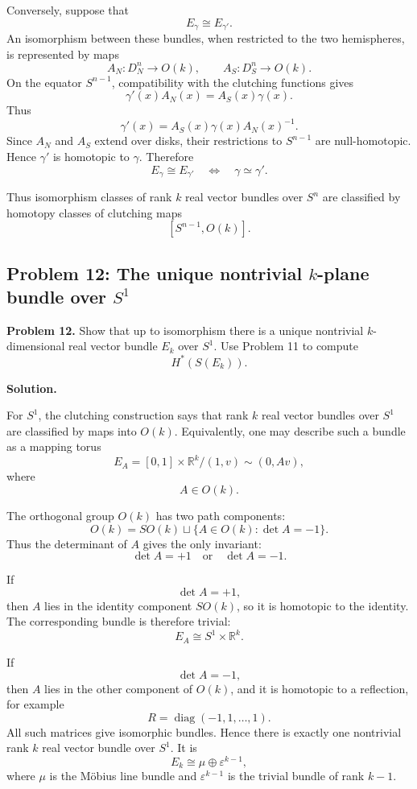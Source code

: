 \documentclass[12pt,a4paper]{article}
\theoremstyle{notespace}
\begin{document}
Conversely, suppose that
\[
E_{\gamma}\cong E_{\gamma'}.
\]
An isomorphism between these bundles, when restricted to the two hemispheres, is represented by maps
\[
A_N:D_N^n\to O(k),
\qquad
A_S:D_S^n\to O(k).
\]
On the equator \(S^{n-1}\), compatibility with the clutching functions gives
\[
\gamma'(x)A_N(x)=A_S(x)\gamma(x).
\]
Thus
\[
\gamma'(x)
=
A_S(x)\gamma(x)A_N(x)^{-1}.
\]
Since \(A_N\) and \(A_S\) extend over disks, their restrictions to \(S^{n-1}\) are null-homotopic. Hence \(\gamma'\) is homotopic to \(\gamma\). Therefore
\[
E_{\gamma}\cong E_{\gamma'}
\quad\Longleftrightarrow\quad
\gamma\simeq \gamma'.
\]

Thus isomorphism classes of rank \(k\) real vector bundles over \(S^n\) are classified by homotopy classes of clutching maps
\[
[S^{n-1},O(k)].
\]

\subsection{Problem 12: The unique nontrivial \(k\)-plane bundle over \(S^1\)}

\textbf{Problem 12.}
Show that up to isomorphism there is a unique nontrivial \(k\)-dimensional real vector bundle \(E_k\) over \(S^1\). Use Problem 11 to compute
\[
H^*(S(E_k)).
\]

\textbf{Solution.}

For \(S^1\), the clutching construction says that rank \(k\) real vector bundles over \(S^1\) are classified by maps into \(O(k)\). Equivalently, one may describe such a bundle as a mapping torus
\[
E_A
=
[0,1]\times \mathbb{R}^k
\big/
(1,v)\sim (0,Av),
\]
where
\[
A\in O(k).
\]

The orthogonal group \(O(k)\) has two path components:
\[
O(k)=SO(k)\sqcup \{A\in O(k):\det A=-1\}.
\]
Thus the determinant of \(A\) gives the only invariant:
\[
\det A=+1
\quad\text{or}\quad
\det A=-1.
\]

If
\[
\det A=+1,
\]
then \(A\) lies in the identity component \(SO(k)\), so it is homotopic to the identity. The corresponding bundle is therefore trivial:
\[
E_A\cong S^1\times \mathbb{R}^k.
\]

If
\[
\det A=-1,
\]
then \(A\) lies in the other component of \(O(k)\), and it is homotopic to a reflection, for example
\[
R=\operatorname{diag}(-1,1,\dots,1).
\]
All such matrices give isomorphic bundles. Hence there is exactly one nontrivial rank \(k\) real vector bundle over \(S^1\). It is
\[
E_k\cong \mu\oplus \varepsilon^{k-1},
\]
where \(\mu\) is the Möbius line bundle and \(\varepsilon^{k-1}\) is the trivial bundle of rank \(k-1\).
\end{document}
